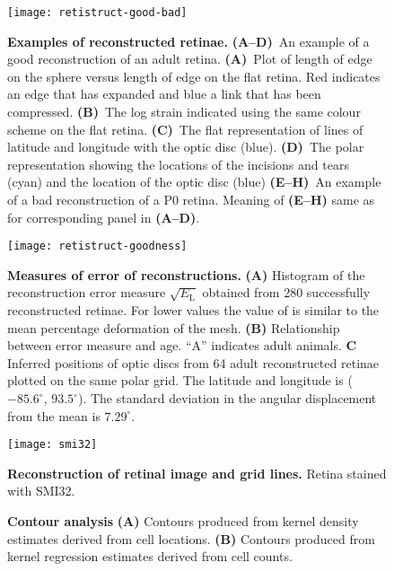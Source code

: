 \documentclass[10pt]{article}
\begin{document}
\begin{figure}[!ht]
  \centering
  \texttt{[image: retistruct-good-bad]}

  \caption{\textbf{Examples of reconstructed retinae.}
    \textbf{(A--D)}~An example of a good reconstruction of an adult
    retina.  \textbf{(A)}~Plot of length of edge on the sphere versus
    length of edge on the flat retina. Red indicates an edge that has
    expanded and blue a link that has been compressed.
    \textbf{(B)}~The log strain indicated using the same colour scheme
    on the flat retina. \textbf{(C)}~The flat representation of lines
    of latitude and longitude with the optic disc
    (blue). \textbf{(D)}~The polar representation showing the
    locations of the incisions and tears (cyan) and the location of
    the optic disc (blue) \textbf{(E--H)}~An example of a bad
    reconstruction of a P0 retina. Meaning of \textbf{(E--H)} same as
    for corresponding panel in \textbf{(A--D)}.}
  \label{retistruct_plos:fig:examples}
\end{figure}

\begin{figure}[!ht]
  \centering
  \texttt{[image: retistruct-goodness]}
  \caption{\textbf{Measures of error of reconstructions.}
    \textbf{(A)} Histogram of the reconstruction error measure
    $\sqrt{E_\mathrm{L}}$ obtained from 280 successfully reconstructed
    retinae. For lower values the value of is similar to the mean
    percentage deformation of the mesh. \textbf{(B)} Relationship
    between error measure and age. ``A'' indicates adult
    animals. \textbf{C} Inferred positions of optic discs from 64
    adult reconstructed retinae plotted on the same polar grid. The
    latitude and longitude is ($-85.6^\circ$, $93.5^\circ$). The
    standard deviation in the angular displacement from the mean is
    $7.29^\circ$.}
  \label{retistruct_plos:fig:summary}
\end{figure}

\begin{figure}[!ht]
  \centering
  \texttt{[image: smi32]}
  \caption{\textbf{Reconstruction of retinal image and grid lines.}
    Retina stained with SMI32. }
  \label{retistruct_plos:fig:superpose}
\end{figure}

\begin{figure}[!ht]
  \centering
  \caption{\textbf{Contour analysis}
      \textbf{(A)} Contours
    produced from kernel density estimates derived from cell
    locations. \textbf{(B)} Contours produced from kernel regression
    estimates derived from cell counts. }
  \label{retistruct_plos:fig:contouring}
\end{figure}
\end{document}
